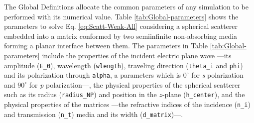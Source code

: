 The Global Definitions allocate the common parameters of any simulation to be performed with its numerical value. Table \ref{tab:Global-parameters} shows the parameters to solve Eq. \eqref{eq:Scatt-Weak-All} considering a spherical scatterer embedded into a matrix conformed by two semiinfinite non-absorbing media forming a planar interface between them. The parameters in Table \ref{tab:Global-parameters} include the properties of the incident electric plane wave ---its amplitude (\lstinline!E_0!),  wavelength (\lstinline!wlength!), traveling direction (\lstinline!theta_i! and \lstinline!phi!) and its polarization through \lstinline!alpha!, a parameters which is $0^\circ$ for \textit{s} polarization and $90^\circ$ for \textit{p} polarization---, the physical properties of the spherical scatterer such as its radius  (\lstinline!radius_NP!) and position in the $z$-plane (\lstinline!h_center!), and the physical properties of the matrices ---the refractive indices of the incidence (\lstinline!n_i!) and transmission (\lstinline!n_t!) media and its width (\lstinline!d_matrix!)---.

